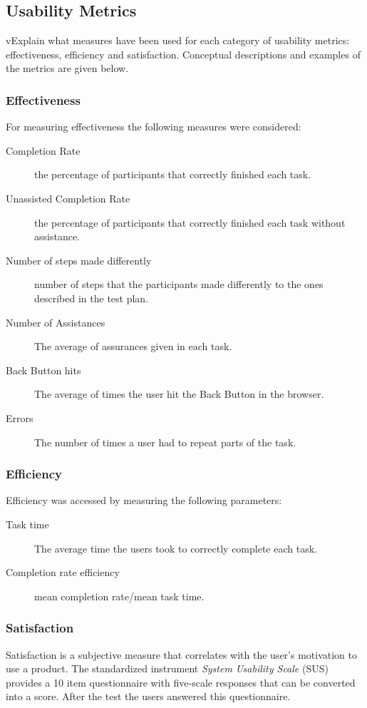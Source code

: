 \documentclass[a4paper]{article}
\begin{document}
\subsection{Usability Metrics}
vExplain what measures have been used for each category of usability metrics: effectiveness, efficiency and satisfaction. Conceptual descriptions and examples of the metrics are given below.

\subsubsection{Effectiveness}
For measuring effectiveness the following measures were considered:
  \begin{description}
    

    \item[Completion Rate] the percentage of participants that correctly finished each task.
 \item[Unassisted Completion Rate] the percentage of participants that correctly finished each task without assistance.
 \item[Number of steps made differently] number of steps that the participants made differently to the ones described in the test plan.
 \item[Number of Assistances] The average of assurances given in each task.
 \item[Back Button hits] The average of times the user hit the Back Button in the browser.
 \item[Errors] The number of times a user had to repeat parts of the task.
  \end{description} 
 
 \subsubsection{Efficiency}
 Efficiency was accessed by measuring the following parameters:
\begin{description}  

  \item[Task time] The average time the users took to correctly complete each task.
 \item[Completion rate efficiency] mean completion rate/mean task time.
\end{description} 
 
 \subsubsection{Satisfaction}
 Satisfaction is a subjective measure that correlates with the user's motivation to use a product. The standardized instrument \textit{System Usability Scale} (SUS) provides a 10 item questionnaire with five-scale responses that can be converted into a score. After the test the users answered this questionnaire. 
 
\end{document}
